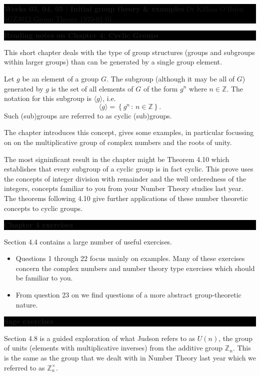 \documentclass[oneside,10pt]{amsart}
\newcommand{\cbox}[1]{\colorbox{black}{\begin{minipage}{\linewidth}\color{white}\sffamily #1 \end{minipage}}}
\newcommand{\tuttitle}[4]{\cbox{\textbf{#1} \hfill {#2}\\{#3} \hfill {\Small #4}}\vskip 4pt}
\newcommand{\topic}[1]{\cbox{\textbf{#1}}\vskip 4pt}
\begin{document}
\tuttitle{Weeks 03, 04, 05 $|$ Initial group theory \& examples}{Dr Killian O'Brien}{6GZ3012 Group Theory}{\today}
\vskip 16pt

\topic{Reading notes on Chapter 4: Cyclic Groups}
This short chapter deals with the type of group structures (groups and subgroups within larger groups) than can be generated by a single group element.

Let $g$ be an element of a group $G$. The subgroup (although it may be all of $G$) generated by $g$ is the set of all elements of $G$ of the form $g^n$ where $n \in \mathbb{Z}$. The notation for this subgroup is $\langle g \rangle$, i.e.
$$\langle g \rangle = \left \{ g^n \, : \, n \in \mathbb{Z} \right \}.$$ Such (sub)groups are referred to as cyclic (sub)groups.

The chapter introduces this concept, gives some examples, in particular focussing on on the multiplicative group of complex numbers and the roots of unity.

The most signinficant result in the chapter might be Theorem 4.10 which establishes that every subgroup of a cyclic group is in fact cyclic. This prove uses the concepts of integer division with remainder and the well orderedness of the integers, concepts familiar to you from your Number Theory studies last year. The theorems following 4.10 give further applications of these number theoretic concepts to cyclic groups.

\vskip 4pt

\topic{Chapter 4 exercises}
Section 4.4 contains a large number of useful exercises.

\begin{itemize}
\item
Questions 1 through 22 focus mainly on examples. Many of these exercises concern the complex numbers and number theory type exercises which should be familiar to you.
\item
From question 23 on we find questions of a more abstract group-theoretic nature.
\end{itemize}

\vskip 4pt

\topic{Sage exercises}
Section 4.8 is a guided exploration of what Judson refers to as $U(n)$, the group of units (elements with multiplicative inverses) from the additive group $\mathbb{Z}_n$. This is the same as the group that we dealt with in Number Theory last year which we referred to as $\mathbb{Z}_n^\times$.
\end{document}
